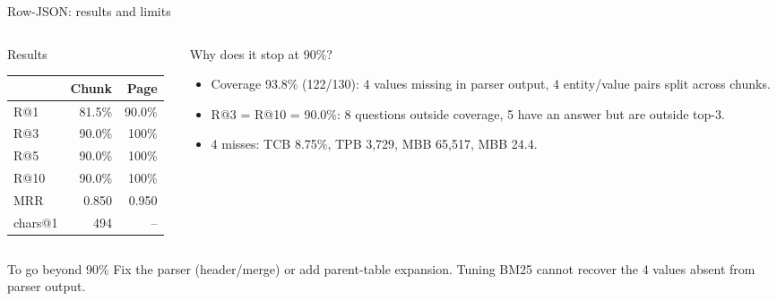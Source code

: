 \documentclass[aspectratio=169,11pt]{beamer}
\begin{document}
\begin{frame}{Row-JSON: results and limits}
  \begin{columns}[T]
    \begin{column}{0.40\textwidth}
      \begin{block}{Results}
        \centering
        \small
        \begin{tabular}{@{}lrr@{}}
          \toprule
          & \textbf{Chunk} & \textbf{Page} \\
          \midrule
          R@1  & 81.5\% & 90.0\% \\
          R@3  & 90.0\% & 100\% \\
          R@5  & 90.0\% & 100\% \\
          R@10 & 90.0\% & 100\% \\
          MRR  & 0.850 & 0.950 \\
          chars@1 & 494 & -- \\
          \bottomrule
        \end{tabular}
      \end{block}
    \end{column}
    \begin{column}{0.56\textwidth}
      \begin{block}{Why does it stop at 90\%?}
        \begin{itemize}\small
          \item Coverage 93.8\% (122/130): 4 values missing in parser output,
            4 entity/value pairs split across chunks.
          \item R@3 = R@10 = 90.0\%: 8 questions outside coverage, 5 have an
            answer but are outside top-3.
          \item 4 misses: TCB 8.75\%, TPB 3,729, MBB 65,517, MBB 24.4.
        \end{itemize}
      \end{block}
    \end{column}
  \end{columns}

  \vspace{0.2em}
  \begin{alertblock}{To go beyond 90\%}
    \small
    Fix the parser (header/merge) or add parent-table expansion. Tuning BM25
    cannot recover the 4 values absent from parser output.
  \end{alertblock}
\end{frame}
\end{document}
